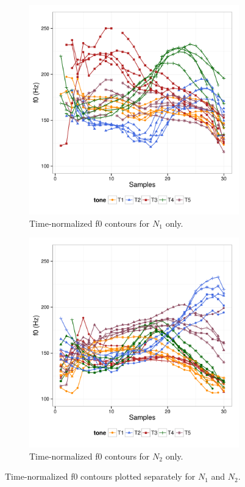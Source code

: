 \documentclass[12pt]{article}
\begin{document}
\begin{figure}
\centering
\begin{subfigure}[t]{0.5\textwidth}
  \centering
  \includegraphics[width=\textwidth]{kiy-20111213-plot-w1}
  \caption{Time-normalized f0 contours for $N_1$ only.}
  \label{fig:kiy-20111213-plot-w1}
\end{subfigure}

\begin{subfigure}[t]{0.5\textwidth}
  \centering
  \includegraphics[width=\textwidth]{kiy-20111213-plot-w2}
  \caption{Time-normalized f0 contours for $N_2$ only.}
  \label{fig:kiy-20111213-plot-w2}
\end{subfigure}
\caption{Time-normalized f0 contours plotted separately for $N_1$ and $N_2$.}\label{fig:w1w2}
\end{figure}
\end{document}
